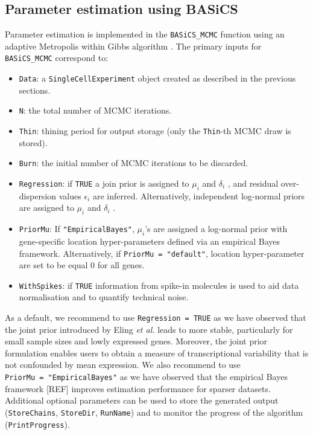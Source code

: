 \documentclass[9pt,a4paper,]{extarticle}
\begin{document}
\hypertarget{parameter-estimation-using-basics}{%
\subsection{Parameter estimation using BASiCS}\label{parameter-estimation-using-basics}}

Parameter estimation is implemented in the \texttt{BASiCS\_MCMC} function using an
adaptive Metropolis within Gibbs algorithm \citep{Roberts2009}.
The primary inputs for \texttt{BASiCS\_MCMC} correspond to:

\begin{itemize}
\item
  \texttt{Data}: a \texttt{SingleCellExperiment} object created as described in the
  previous sections.
\item
  \texttt{N}: the total number of MCMC iterations.
\item
  \texttt{Thin}: thining period for output storage
  (only the \texttt{Thin}-th MCMC draw is stored).
\item
  \texttt{Burn}: the initial number of MCMC iterations to be discarded.
\item
  \texttt{Regression}: if \texttt{TRUE} a join prior is assigned to \(\mu_i\) and \(\delta_i\)
  \citep{Eling2018}, and residual over-dispersion values \(\epsilon_i\) are inferred.
  Alternatively, independent log-normal priors are assigned to \(\mu_i\) and
  \(\delta_i\) \citep{Vallejos2016}.
\item
  \texttt{PriorMu}: If \texttt{"EmpiricalBayes"}, \(\mu_i\)'s are assigned a log-normal prior
  with gene-specific location hyper-parameters defined via an empirical Bayes
  framework. Alternatively, if \texttt{PriorMu\ =\ "default"}, location hyper-parameter are
  set to be equal 0 for all genes.
\item
  \texttt{WithSpikes}: if \texttt{TRUE} information from spike-in molecules is used to aid
  data normalisation and to quantify technical noise.
\end{itemize}

As a default, we recommend to use \texttt{Regression\ =\ TRUE} as we have observed that
the joint prior introduced by Eling \emph{et al.} leads to more stable, particularly
for small sample sizes and lowly expressed genes.
Moreover, the joint prior formulation enables users to obtain a measure of
transcriptional variability that is not confounded by mean expression.
We also recommend to use \texttt{PriorMu\ =\ "EmpiricalBayes"} as we have observed
that the empirical Bayes framework {[}REF{]} improves estimation performance for
sparser datasets.
Additional optional parameters can be used to store the generated output
(\texttt{StoreChains}, \texttt{StoreDir}, \texttt{RunName}) and to monitor the progress of the
algorithm (\texttt{PrintProgress}).
\end{document}
